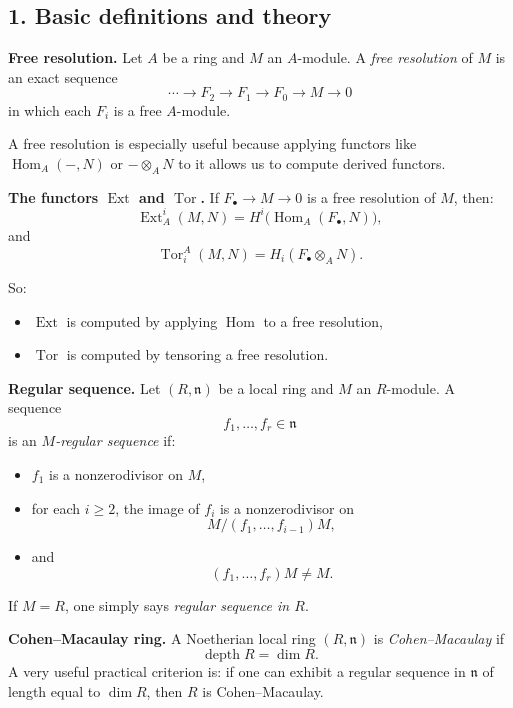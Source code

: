 \documentclass[12pt,a4paper]{article}
\theoremstyle{notespace}
\DeclareMathOperator{\Hom}{Hom}
\DeclareMathOperator{\depth}{depth}
\DeclareMathOperator{\Tor}{Tor}
\DeclareMathOperator{\Ext}{Ext}
\begin{document}
\subsection{1. Basic definitions and theory}

\textbf{Free resolution.}
Let \(A\) be a ring and \(M\) an \(A\)-module. A \emph{free resolution} of \(M\) is an exact sequence
\[
\cdots \longrightarrow F_2 \longrightarrow F_1 \longrightarrow F_0 \longrightarrow M \longrightarrow 0
\]
in which each \(F_i\) is a free \(A\)-module.

A free resolution is especially useful because applying functors like \(\Hom_A(-,N)\) or \(-\otimes_A N\) to it allows us to compute derived functors.

\medskip

\textbf{The functors \(\Ext\) and \(\Tor\).}
If \(F_\bullet\to M\to 0\) is a free resolution of \(M\), then:
\[
\Ext_A^i(M,N)=H^i\bigl(\Hom_A(F_\bullet,N)\bigr),
\]
and
\[
\Tor_i^A(M,N)=H_i(F_\bullet\otimes_A N).
\]

So:
\begin{itemize}
	\item \(\Ext\) is computed by applying \(\Hom\) to a free resolution,
	\item \(\Tor\) is computed by tensoring a free resolution.
\end{itemize}

\medskip

\textbf{Regular sequence.}
Let \((R,\mathfrak n)\) be a local ring and \(M\) an \(R\)-module. A sequence
\[
f_1,\dots,f_r\in \mathfrak n
\]
is an \emph{\(M\)-regular sequence} if:
\begin{itemize}
	\item \(f_1\) is a nonzerodivisor on \(M\),
	\item for each \(i\ge 2\), the image of \(f_i\) is a nonzerodivisor on
	\[
	M/(f_1,\dots,f_{i-1})M,
	\]
	\item and
	\[
	(f_1,\dots,f_r)M\neq M.
	\]
\end{itemize}

If \(M=R\), one simply says \emph{regular sequence in \(R\)}.

\medskip

\textbf{Cohen--Macaulay ring.}
A Noetherian local ring \((R,\mathfrak n)\) is \emph{Cohen--Macaulay} if
\[
\depth R=\dim R.
\]
A very useful practical criterion is:
if one can exhibit a regular sequence in \(\mathfrak n\) of length equal to \(\dim R\), then \(R\) is Cohen--Macaulay.
\end{document}
